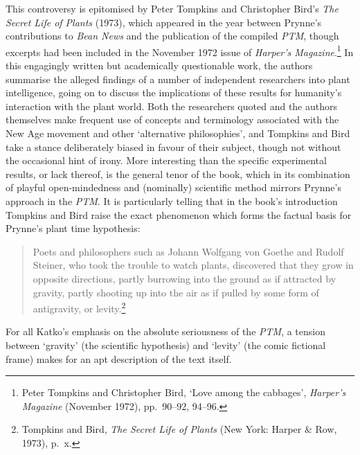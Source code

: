 \documentclass[]{article}
\begin{document}
This controversy is epitomised by Peter Tompkins and Christopher Bird's
\emph{The Secret Life of Plants} (1973), which appeared in the year
between Prynne's contributions to \emph{Bean News} and the publication
of the compiled \emph{PTM}, though excerpts had been included in the
November 1972 issue of \emph{Harper's Magazine}.\footnote{Peter Tompkins
  and Christopher Bird, `Love among the cabbages', \emph{Harper's
  Magazine} (November 1972), pp.~90--92, 94--96.} In this engagingly
written but academically questionable work, the authors summarise the
alleged findings of a number of independent researchers into plant
intelligence, going on to discuss the implications of these results for
humanity's interaction with the plant world. Both the researchers quoted
and the authors themselves make frequent use of concepts and terminology
associated with the New Age movement and other `alternative
philosophies', and Tompkins and Bird take a stance deliberately biased
in favour of their subject, though not without the occasional hint of
irony. More interesting than the specific experimental results, or lack
thereof, is the general tenor of the book, which in its combination of
playful open-mindedness and (nominally) scientific method mirrors
Prynne's approach in the \emph{PTM}. It is particularly telling that in
the book's introduction Tompkins and Bird raise the exact phenomenon
which forms the factual basis for Prynne's plant time hypothesis:

\begin{quote}
Poets and philosophers such as Johann Wolfgang von Goethe and Rudolf
Steiner, who took the trouble to watch plants, discovered that they grow
in opposite directions, partly burrowing into the ground as if attracted
by gravity, partly shooting up into the air as if pulled by some form of
antigravity, or levity.\footnote{Tompkins and Bird, \emph{The Secret
  Life of Plants} (New York: Harper \& Row, 1973), p.~x.}
\end{quote}

\noindent For all Katko's emphasis on the absolute seriousness of the
\emph{PTM}, a tension between `gravity' (the scientific hypothesis) and
`levity' (the comic fictional frame) makes for an apt description of the
text itself.
\end{document}
